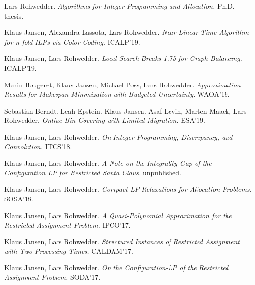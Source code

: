 \documentclass{article}
\begin{document}
     \noindent
     Lars Rohwedder. {\it Algorithms for Integer Programming and Allocation.} Ph.D. thesis. \medskip

  
     \noindent
     Klaus Jansen, Alexandra Lassota, Lars Rohwedder. {\it Near-Linear Time Algorithm for n-fold ILPs via Color Coding.} ICALP'19. \medskip

  
     \noindent
     Klaus Jansen, Lars Rohwedder. {\it Local Search Breaks 1.75 for Graph Balancing.} ICALP'19. \medskip

  
     \noindent
     Marin Bougeret, Klaus Jansen, Michael Poss, Lars Rohwedder. {\it Approximation Results for Makespan Minimization with Budgeted Uncertainty.} WAOA'19. \medskip

  
     \noindent
     Sebastian Berndt, Leah Epstein, Klaus Jansen, Asaf Levin, Marten Maack, Lars Rohwedder. {\it Online Bin Covering with Limited Migration.} ESA'19. \medskip

  
     \noindent
     Klaus Jansen, Lars Rohwedder. {\it On Integer Programming, Discrepancy, and Convolution.} ITCS'18. \medskip

  
     \noindent
     Klaus Jansen, Lars Rohwedder. {\it A Note on the Integrality Gap of the Configuration LP for Restricted Santa Claus.} unpublished. \medskip

  
     \noindent
     Klaus Jansen, Lars Rohwedder. {\it Compact LP Relaxations for Allocation Problems.} SOSA'18. \medskip

  
     \noindent
     Klaus Jansen, Lars Rohwedder. {\it A Quasi-Polynomial Approximation for the Restricted Assignment Problem.} IPCO'17. \medskip

  
     \noindent
     Klaus Jansen, Lars Rohwedder. {\it Structured Instances of Restricted Assignment with Two Processing Times.} CALDAM'17. \medskip

  
     \noindent
     Klaus Jansen, Lars Rohwedder. {\it On the Configuration-LP of the Restricted Assignment Problem.} SODA'17. \medskip

  
\end{document}
